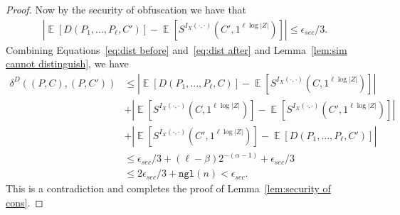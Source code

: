 \documentclass[11pt]{article}
\newcommand{\lemref}[1]{\mbox{Lemma~\ref{#1}}}
\DeclareMathOperator*{\expe}{\mathbb{E}}
\newcommand{\ngl}{\ensuremath{\mathtt{ngl}}\xspace}
\begin{document}
\begin{proof}
\noindent Now by the security of obfuscation we have that
\begin{align}
\label{eq:dist after}
|\expe [D(P_1,..., P_\ell, C') ]- \expe [S^{I_X(\cdot, \cdot)}(C', 1^{\ell \log |Z|})] |\leq \epsilon_{sec}/3.
\end{align}
Combining Equations~\ref{eq:dist before} and~\ref{eq:dist after} and \lemref{lem:sim cannot distinguish}, we have
\begin{align*}
\delta^{D}(( P, C), (P, C'))&\leq |\expe [D(P_1,..., P_\ell, C)] - \expe [S^{I_X(\cdot, \cdot)}(C, 1^{\ell \log |Z|})]| \\
&+|\expe[S^{I_X(\cdot, \cdot)}(C, 1^{\ell \log |Z|})] - \expe[S^{I_X(\cdot, \cdot)}(C', 1^{\ell \log |Z|})] |\\
&+|\expe [S^{I_X(\cdot, \cdot)}(C', 1^{\ell \log |Z|})] - \expe [D(P_1,..., P_\ell, C') ]|\\
&\leq \epsilon_{sec}/3+ (\ell-\beta)2^{-(\alpha-1)}+\epsilon_{sec}/3 \\
&\leq 2\epsilon_{sec}/3 + \ngl(n) < \epsilon_{sec}.
\end{align*}
This is a contradiction and completes the proof of \lemref{lem:security of cons}.
\end{proof}
\end{document}
